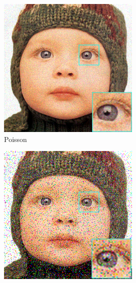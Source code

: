 \begin{figure}
\begin{subfigure}{0.24\textwidth}
		\includegraphics[width=\textwidth]{images/exp1.2/poisson0.png}
		\caption{Poisson}
	\end{subfigure}
	\begin{subfigure}{0.24\textwidth}
		\includegraphics[width=\textwidth]{images/exp1.2/salt0.png}

\end{subfigure}
\end{figure}

